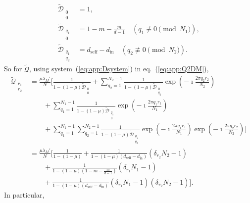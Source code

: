 \documentclass[11pt, letterpaper]{article}
\renewcommand{\eqref}[1]{\textup{{\normalfont eq.~(\ref{#1}}\normalfont)}}
\newcommand{\sysref}[1]{system~(\ref{#1})}
\newcommand{\self}{\textrm{self}}
\newcommand{\inn}{\textrm{in}}
\newcommand{\din}{d_{\inn}}
\newcommand{\dself}{d_{\self}}
\begin{document}
%
\begin{subequations}\label{eq:app:Dsystem}
\begin{align}
\tilde{\mathcal{D}}_{\substack{0\\0}} & = 1,\\
%
\tilde{\mathcal{D}}_{\substack{q_1\\0}} & = 1-m -  \frac{m}{d-1} \quad (q_1 \not \equiv 0 \pmod{N_1}),\\
%
\tilde{\mathcal{D}}_{\substack{q_1\\q_2}} & = \dself - \din \quad (q_2 \not \equiv 0 \pmod{N_2}).
\end{align}
\end{subequations}
%
So for $\tilde{\mathcal{Q}}$, using \sysref{eq:app:Dsystem} in \eqref{eq:app:Q2DM}, 
%
\begin{align}
\tilde{\mathcal{Q}}_{\substack{r_1\\r_2}}&= \frac{\mu \lambda_M'}{N} \Bigg[  \frac{1}{1 - (1-\mu) \tilde{\mathcal{D}}_{\substack{0\\ 0}}} + \sum_{q_2 = 1}^{N_2-1}\frac{1}{1 - (1-\mu) \tilde{\mathcal{D}}_{\substack{0\\ q_2}}} \exp\left(-\imath \frac{2\pi q_2 r_2}{N_2}\right) \nonumber \\
& \qquad 
+ \sum_{q_1 =1}^{N_1 - 1} \frac{1}{1 - (1-\mu) \tilde{\mathcal{D}}_{\substack{q_1\\ 0}}} \exp\left(-\imath \frac{2\pi q_1 r_1}{N_1}\right) \nonumber \\
& \qquad 
+ 
 \sum_{q_1=1}^{N_1 -1} \sum_{q_2=1}^{N_2 -1} \frac{1}{1 - (1-\mu) \tilde{\mathcal{D}}_{\substack{q_1\\ q_2}}} \exp\left(-\imath \frac{2\pi q_1 r_1}{N_1}\right)\exp\left(-\imath \frac{2\pi q_2 r_2}{N_2}\right) \Bigg]\nonumber \\
& = \frac{\mu \lambda_M'}{N} \Bigg[  \frac{1}{1 - (1-\mu) } 
+ \frac{1}{1 - (1-\mu) (\dself - \din)} (\delta_{r_2} N_2 - 1) \nonumber \\
& \qquad 
+  \frac{1}{1 - (1-\mu) (1-m-\frac{m}{d-1})} (\delta_{r_1} N_1 - 1) \nonumber \\
& \qquad 
+ 
\frac{1}{1 - (1-\mu) (\dself - \din) } (\delta_{r_1} N_1 - 1) (\delta_{r_2} N_2 - 1) \Bigg].\label{eq:app:Q2DMsol}
% 
\end{align}
In particular, 
\end{document}
